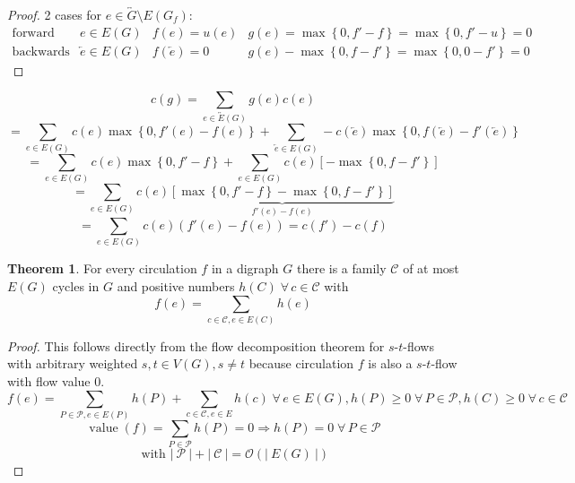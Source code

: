 \documentclass[a4paper]{article}
\theoremstyle{definition}
\newtheorem{theorem}{Theorem}
\newcommand{\card}[1]{\left|\:\!#1\:\!\right|}
\newcommand{\set}[1]{\left\{#1\right\}}
\newcommand{\flow}[2]{$#1$-$#2$-flow}
\newcommand{\fall}{\;\forall\,}
\begin{document}
\begin{proof}
  2 cases for $e \in \overleftrightarrow{G} \setminus E(G_f)$:
  \[
    \begin{array}{llll}
      \text{forward edge} & e \in E(G) & f(e) = u(e) & g(e) = \max\set{0, f' - f} = \max\set{0, f' - u} = 0 \\
      \text{backwards edge} & \overleftarrow{e} \in E(G) & f(\overleftarrow{e}) = 0 & g(e) - \max\set{0, f - f'} = \max\set{0, 0 - f'} = 0
    \end{array}
  \]
\end{proof}

\begin{equation*}
  c(g) = \sum_{e \in \overleftrightarrow{E}(G)} g(e) c(e)
\end{equation*} \begin{equation*}
    = \sum_{e \in E(G)} c(e) \max\set{0, f'(e) - f(e)} + \sum_{\overleftarrow{e} \in E(G)} -c(\overleftarrow{e}) \max\set{0, f(\overleftarrow{e}) - f'(\overleftarrow{e})}
\end{equation*} \begin{equation*}
    = \sum_{e \in E(G)} c(e) \max\set{0, f' - f} + \sum_{e \in E(G)} c(e) [-\max\set{0, f - f'}]
\end{equation*} \begin{equation*}
    = \sum_{e \in E(G)} c(e) \underbrace{
      \left[\max\set{0, f'-f} - \max\set{0, f - f'} \right]
    }_{f'(e) - f(e)}
\end{equation*} \begin{equation*}
    = \sum_{e \in E(G)} c(e) \left(f'(e) - f(e)\right) = c(f') - c(f)
\end{equation*}

\begin{theorem}\label{proposition-5.2}
  For every circulation $f$ in a digraph $G$ there is a family $\mathcal{C}$ of at most $E(G)$ cycles in $G$ and positive numbers $h(C) \fall c \in \mathcal{C}$ with
  \[
    f(e) = \sum_{c \in \mathcal{C}, e \in E(C)} h(e)
  \]
\end{theorem}

\begin{proof}
  This follows directly from the flow decomposition theorem for \flow sts with arbitrary weighted $s,t \in V(G), s \neq t$ because circulation $f$ is also a \flow st with flow value $0$.
  \[
    f(e) = \sum_{P \in \mathcal{P}, e \in E(P)} h(P) + \sum_{c \in \mathcal{C}, e \in E} h(c)
      \fall e \in E(G), h(P) \geq 0 \fall P \in \mathcal{P}, h(C) \geq 0 \fall c \in \mathcal{C}
  \] \[
    \operatorname{value}(f) = \sum_{P \in \mathcal{P}} h(P) = 0 \Rightarrow h(P) = 0 \fall P \in \mathcal{P}
  \] \[
    \text{ with } \card{\mathcal{P}} + \card{\mathcal{C}} = \mathcal{O}(\card{E(G)})
  \]
\end{proof}
\end{document}
